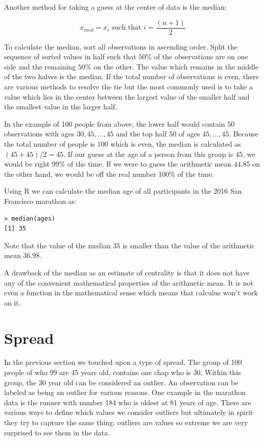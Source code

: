 \documentclass{tufte-book} %
\begin{document}
Another method for taking a guess at the center of data is the median:

\begin{equation} \label{formula:median}
	x_{med} = x_i \mbox{ such that } i = \frac{(n + 1)}{2}
\end{equation}

To calculate the median, sort all observations in ascending order. Split the sequence of sorted values in half such that $50\%$ of the observations are on one side and the remaining $50\%$ on the other. The value which remains in the middle of the two halves is the median. If the total number of observations is even, there are various methods to resolve the tie but the most commonly used is to take a value which lies in the center between the largest value of the smaller half and the smallest value in the larger half.

In the example of 100 people from above, the lower half would contain 50 observations with ages $30, 45, ..., 45$ and the top half 50 of ages $45,...,45$. Because the total number of people is 100 which is even, the median is calculated as $(45 + 45) / 2 = 45$. If our guess at the age of a person from this group is 45, we would be right 99\% of the time. If we were to guess the arithmetic mean $44.85$ on the other hand, we would be off the real number 100\% of the time.

Using R we can calculate the median age of all participants in the 2016 San Francisco marathon as:

\begin{Verbatim}
> median(ages)
[1] 35
\end{Verbatim}

Note that the value of the median $35$ is smaller than the value of the arithmetic mean $36.98$.

A drawback of the median as an estimate of centrality is that it does not have any of the convenient mathematical properties of the arithmetic mean. It is not even a function in the mathematical sense which means that calculus won't work on it. 

\section{Spread}

In the previous section we touched upon a type of spread. The group of 100 people of who 99 are 45 years old, contains one chap who is 30. Within this group, the 30 year old can be considered an outlier. An observation can be labeled as being an outlier for various reasons. One example in the marathon data is the runner with number 184 who is oldest at 81 years of age. There are various ways to define which values we consider outliers but ultimately in spirit they try to capture the same thing: outliers are values so extreme we are very surprised to see them in the data.
\end{document}
